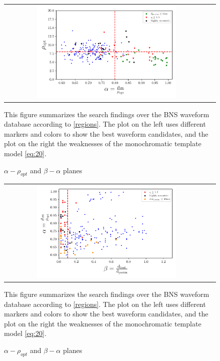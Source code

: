 \begin{figure}[hbt!]
\begin{center}
\begin{tabular}{cc}
\includegraphics[width=0.7\textwidth, angle=0]{images/Data_analysis/results/alpha_sum0.pdf}
\end{tabular}
\end{center}
\caption{$\alpha - \rho_{opt}$ and $\beta - \alpha$  planes}
This figure summarizes the search findings over the BNS waveform database according to \ref{regions}. The plot on the left uses different markers and colors to show the best waveform candidates, and the plot on the right the weaknesses of the monochromatic template model \ref{eq:20}.
\end{figure}

\begin{figure}[hbt!]
\begin{center}
\begin{tabular}{cc}
\includegraphics[width=0.7\textwidth, angle=0]{images/Data_analysis/results/alpha_sum1.pdf}
\end{tabular}
\end{center}
\caption{$\alpha - \rho_{opt}$ and $\beta - \alpha$  planes}
This figure summarizes the search findings over the BNS waveform database according to \ref{regions}. The plot on the left uses different markers and colors to show the best waveform candidates, and the plot on the right the weaknesses of the monochromatic template model \ref{eq:20}.
\end{figure}
\FloatBarrier


